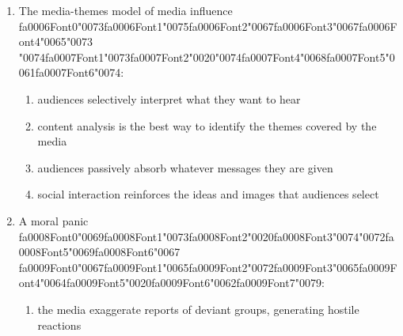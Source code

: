 \documentclass[12pt]{article}
\begin{document}
\begin{enumerate}[label=\arabic*.]
\begin{enumerate}[label=(\alph*)]
    \item both boys and girls being closely attached to their mothers, but then boys breaking away
    \item girls being attached to their mothers but then breaking away
    \item boys being attached to their fathers and girls to their mothers
    \item both boys and girls being closely attached to their fathers, but girls breaking away
\end{enumerate}
\item The media-themes model of media influence {\csname fa0006Font0\endcsname\char"0073}{\csname fa0006Font1\endcsname\char"0075}{\csname fa0006Font2\endcsname\char"0067}{\csname fa0006Font3\endcsname\char"0067}{\csname fa0006Font4\endcsname\char"0065}{\char"0073} {\char"0074}{\csname fa0007Font1\endcsname\char"0073}{\csname fa0007Font2\endcsname\char"0020}{\char"0074}{\csname fa0007Font4\endcsname\char"0068}{\csname fa0007Font5\endcsname\char"0061}{\csname fa0007Font6\endcsname\char"0074}:
\begin{enumerate}[label=(\alph*)]
    \item audiences selectively interpret what they want to hear
    \item content analysis is the best way to identify the themes covered by the media
    \item audiences passively absorb whatever messages they are given
    \item social interaction reinforces the ideas and images that audiences select
\end{enumerate}
\item A moral panic {\csname fa0008Font0\endcsname\char"0069}{\csname fa0008Font1\endcsname\char"0073}{\csname fa0008Font2\endcsname\char"0020}{\csname fa0008Font3\endcsname\char"0074}{\char"0072}{\csname fa0008Font5\endcsname\char"0069}{\csname fa0008Font6\endcsname\char"0067} {\csname fa0009Font0\endcsname\char"0067}{\csname fa0009Font1\endcsname\char"0065}{\csname fa0009Font2\endcsname\char"0072}{\csname fa0009Font3\endcsname\char"0065}{\csname fa0009Font4\endcsname\char"0064}{\csname fa0009Font5\endcsname\char"0020}{\csname fa0009Font6\endcsname\char"0062}{\csname fa0009Font7\endcsname\char"0079}:
\begin{enumerate}[label=(\alph*)]
    \item the media exaggerate reports of deviant groups, generating hostile reactions

\end{enumerate}
\end{enumerate}
\end{document}

